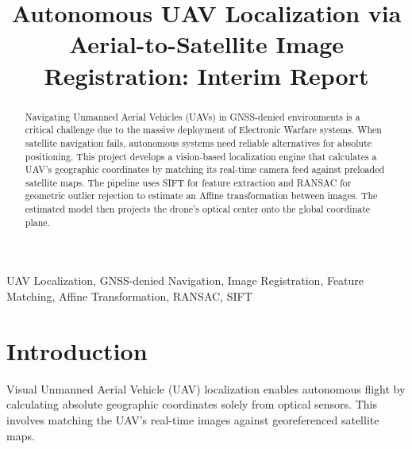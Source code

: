 \documentclass[conference]{IEEEtran}
\begin{document}
\title{Autonomous UAV Localization via Aerial-to-Satellite Image Registration: Interim Report\\
}

\author{
\and
{}
\and
{}
}

\maketitle

\begin{abstract}
Navigating Unmanned Aerial Vehicles (UAVs) in GNSS-denied environments is a critical challenge due to the massive deployment of Electronic Warfare systems. When satellite navigation fails, autonomous systems need reliable alternatives for absolute positioning. This project develops a vision-based localization engine that calculates a UAV's geographic coordinates by matching its real-time camera feed against preloaded satellite maps. The pipeline uses SIFT for feature extraction and RANSAC for geometric outlier rejection to estimate an Affine transformation between images. The estimated model then projects the drone's optical center onto the global coordinate plane.
\end{abstract}

\begin{IEEEkeywords}
UAV Localization, GNSS-denied Navigation, Image Registration, Feature Matching, Affine Transformation, RANSAC, SIFT
\end{IEEEkeywords}

\section{Introduction}
Visual Unmanned Aerial Vehicle (UAV) localization enables autonomous flight by calculating absolute geographic coordinates solely from optical sensors. This involves matching the UAV's real-time images against georeferenced satellite maps.
\end{document}
